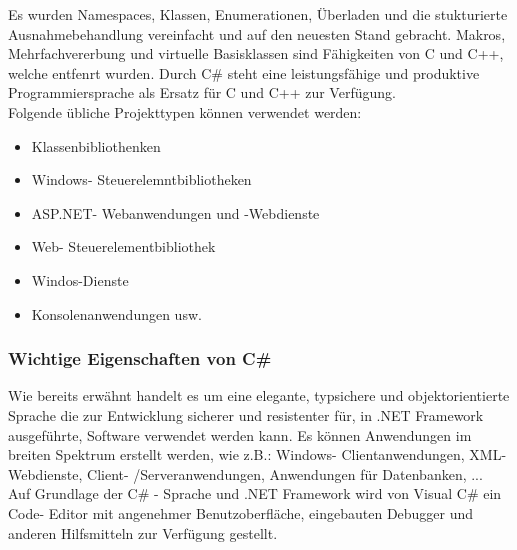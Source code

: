 \documentclass[12pt,a4paper]{report}
\begin{document}
Es wurden Namespaces, Klassen, Enumerationen, Überladen und die stukturierte Ausnahmebehandlung vereinfacht und auf den neuesten Stand gebracht. Makros, Mehrfachvererbung und virtuelle Basisklassen sind Fähigkeiten von C und C++, welche entfenrt wurden. Durch C\# steht eine leistungsfähige und produktive Programmiersprache als Ersatz für C und C++ zur Verfügung.
\\Folgende übliche Projekttypen können verwendet werden:
\begin{itemize}
\item Klassenbibliothenken
\item Windows- Steuerelemntbibliotheken
\item ASP.NET- Webanwendungen und -Webdienste
\item Web- Steuerelementbibliothek
\item Windos-Dienste
\item Konsolenanwendungen usw.
\end{itemize}

\subsubsection{Wichtige Eigenschaften von C\#}
Wie bereits erwähnt handelt es um eine elegante, typsichere und objektorientierte Sprache die zur Entwicklung sicherer und resistenter für, in .NET Framework ausgeführte, Software verwendet werden kann. Es können Anwendungen im breiten Spektrum erstellt werden, wie z.B.: Windows- Clientanwendungen, XML- Webdienste, Client- /Serveranwendungen, Anwendungen für Datenbanken, ...\\

Auf Grundlage der C\# - Sprache und .NET Framework wird von Visual C\# ein Code- Editor mit angenehmer Benutzoberfläche, eingebauten Debugger und anderen Hilfsmitteln zur Verfügung gestellt.\\
\end{document}
